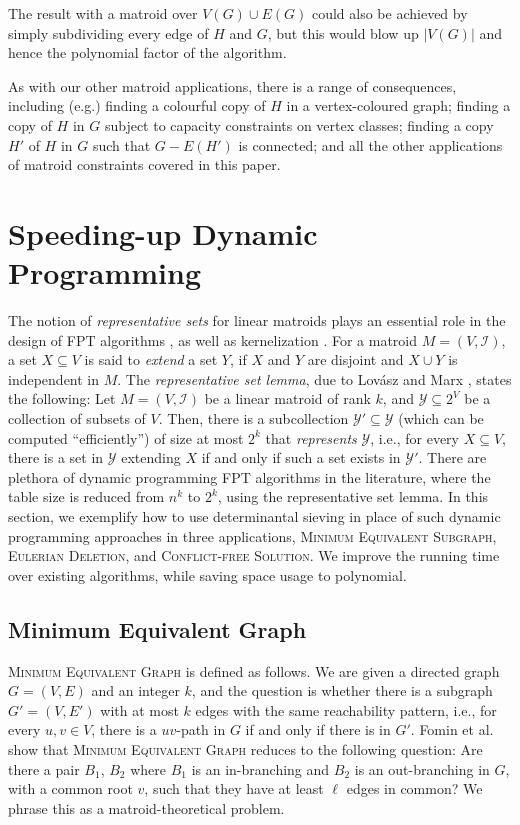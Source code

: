 \documentclass[10pt,a4paper]{article}
\newcommand{\cI}{\ensuremath{\mathcal I}\xspace}
\begin{document}
The result with a matroid over $V(G) \cup E(G)$ could also be achieved
by simply subdividing every edge of $H$ and $G$, but this would blow
up $|V(G)|$ and hence the polynomial factor of the algorithm.

As with our other matroid applications, there is a range of
consequences, including (e.g.) finding a colourful copy of $H$
in a vertex-coloured graph; finding a copy of $H$ in $G$ subject to
capacity constraints on vertex classes; finding a copy $H'$ of $H$ in
$G$ such that $G-E(H')$ is connected; and all the other applications
of matroid constraints covered in this paper.


\section{Speeding-up Dynamic Programming}
\label{sec:noDP}

The notion of \emph{representative sets} for linear matroids plays an essential role in the design of FPT algorithms \cite{FominLPS16JACM,FominLPS17}, as well as kernelization \cite{KratschW20JACM}.
For a matroid $M = (V, \cI)$, a set $X \subseteq V$ is said to \emph{extend} a set $Y$, if $X$ and $Y$ are disjoint and $X \cup Y$ is independent in $M$.
The \emph{representative set lemma}, due to Lov\'asz \cite{Lovasz1977} and Marx \cite{Marx09-matroid}, states the following:
Let $M = (V, \cI)$ be a linear matroid of rank $k$, and $\mathcal Y \subseteq 2^V$ be a collection of subsets of $V$.
Then, there is a subcollection $\mathcal Y' \subseteq \mathcal Y$ (which can be computed ``efficiently'') of size at most $2^k$ that \emph{represents} $\mathcal Y$, i.e., for every $X \subseteq V$, there is a set in $\mathcal Y$ extending $X$ if and only if such a set exists in $\mathcal Y'$.
There are plethora of dynamic programming FPT algorithms in the literature, where the table size is reduced from $n^k$ to $2^k$, using the representative set lemma.
In this section, we exemplify how to use determinantal sieving in place of such dynamic programming approaches in three applications, \textsc{Minimum Equivalent Subgraph}, \textsc{Eulerian Deletion}, and \textsc{Conflict-free Solution}.
We improve the running time over existing algorithms, while saving space usage to polynomial.

\subsection{Minimum Equivalent Graph}

\textsc{Minimum Equivalent Graph} is defined as follows.
We are given a directed graph $G = (V, E)$ and an integer $k$, and the question is whether there is a subgraph $G' = (V, E')$ with at most $k$ edges with the same reachability pattern, i.e., for every $u, v \in V$, there is a $uv$-path in $G$ if and only if there is in $G'$.
Fomin et al.~\cite{FominLPS16JACM} show that \textsc{Minimum
  Equivalent Graph} reduces to the following question:
Are there a pair $B_1$, $B_2$ where $B_1$ is an in-branching
and $B_2$ is an out-branching in $G$, with a common root $v$,
such that they have at least $\ell$ edges in common? 
We phrase this as a matroid-theoretical problem. 
\end{document}
